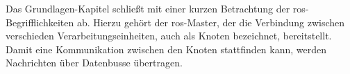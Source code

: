 Das Grundlagen-Kapitel schließt mit einer kurzen Betrachtung der \gls{ros}-Begrifflichkeiten ab. Hierzu gehört der \gls{ros}-Master, der die Verbindung zwischen verschieden Verarbeitungseinheiten, auch als Knoten bezeichnet, bereitstellt. Damit eine Kommunikation zwischen den Knoten stattfinden kann, werden Nachrichten über Datenbusse übertragen.




	






